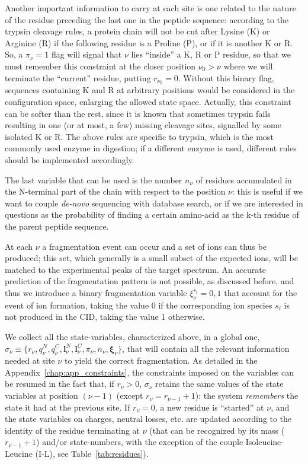 Another important information to carry at each site is one related to the nature
of the residue preceding the last one in the peptide sequence: according to the
trypsin cleavage rules, a protein chain will not be cut after Lysine (K) or
Arginine (R) if the following residue is a Proline (P), or if it is another K or
R. 
So, a $\pi_\nu=1$ flag will signal that $\nu$ lies ``inside'' a K, R or P
residue, so that we must remember this constraint at the closer position
$\nu_0>\nu$ where we will terminate the ``current'' residue, putting
$r_{\nu_0}=0$. Without this binary flag, sequences containing K and R at
arbitrary positions would be considered in the configuration space, enlarging
the allowed state space. Actually, this constraint can be softer than the rest,
since it is known that sometimes trypsin fails resulting in one (or at most, a
few) missing cleavage sites, signalled by some isolated K or R.
The above rules are specific to trypsin, which is the most commonly used enzyme
in digestion; if a different enzyme is used, different rules should be
implemented accordingly.
 
The last variable that can be used is the number $n_{\nu}$ of residues
accumulated in the N-terminal part of the chain with respect to the position
$\nu$: this is useful if we want to couple \emph{de-novo} sequencing with database
search, or if we are interested in questions as the probability of finding a
certain amino-acid as the k-th residue of the parent peptide sequence.

At each $\nu$ a fragmentation event can occur and a set of ions can thus be
produced; this
set, which generally is a small subset of the expected ions, will be matched to
the experimental peaks of the target spectrum.
An accurate prediction of the fragmentation pattern is not possible, as discussed
before, and thus we introduce a binary fragmentation variable
$\xi_\nu^{s_i}=0,1$ that account for the event of ion formation, taking the
value 0 if the corresponding ion species $s_i$ is not produced in the CID,
taking the value 1 otherwise.

We collect all the state-variables, characterized above, in a global one,   
$\sigma_\nu\equiv\{r_\nu,q^N_\nu,q^C_\nu,{\bm l}^N_\nu,{\bm
l}^C_\nu,\pi_\nu,n_\nu,\bm \xi_\nu\}$, that will contain all the relevant information needed
at site $\nu$ to yield the correct fragmentation.
As detailed in the Appendix~\ref{chap:app_constraints}, the constraints imposed
on the variables can be resumed in the fact that, if
$r_\nu>0$, $\sigma_\nu$ retains the same values of the state variables  at
position $(\nu-1)$ (except $r_\nu=r_{\nu-1}+1$): the system \emph{remembers} the
state it had at the previous site.
  If $r_\nu=0$, a new residue is ``started'' at $\nu$, and the state variables
on charges, neutral losses, etc. are updated according to the identity of the
residue terminating at $\nu$ (that can be recognized by its mass ($r_{\nu-1}+1$)
and/or state-numbers, with the exception of the couple Isoleucine-Leucine (I-L), see
Table~\ref{tab:residues}).

